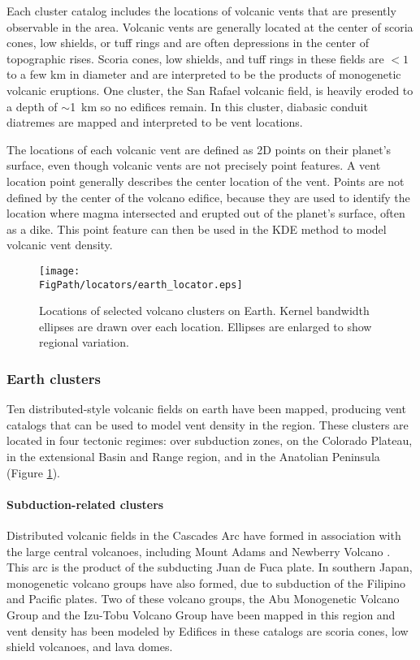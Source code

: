 Each cluster catalog includes the locations of volcanic vents that are presently observable in the area. Volcanic vents are generally located at the center of scoria cones, low shields, or tuff rings and are often depressions in the center of topographic rises. Scoria cones, low shields, and tuff rings in these fields are $<1$ to a few km in diameter and are interpreted to be the products of monogenetic volcanic eruptions. One cluster, the San Rafael volcanic field, is heavily eroded to a depth of $\sim$1~km so no edifices remain. In this cluster, diabasic conduit diatremes are mapped and interpreted to be vent locations.

The locations of each volcanic vent are defined as 2D points on their planet's surface, even though volcanic vents are not precisely point features. A vent location point generally describes the center location of the vent. Points are not defined by the center of the volcano edifice, because they are used to identify the location where magma intersected and erupted out of the planet's surface, often as a dike. This point feature can then be used in the KDE method to model volcanic vent density.

\begin{figure}
\centering
\texttt{[image: \\FigPath/locators/earth\_locator.eps]}
\caption[Locations of selected volcano clusters on Earth]{Locations of selected volcano clusters on Earth. Kernel bandwidth ellipses are drawn over each location. Ellipses are enlarged to show regional variation.}
\label{fig_earthlocator}
\end{figure}

\subsubsection{Earth clusters}
Ten distributed-style volcanic fields on earth have been mapped, producing vent catalogs that can be used to model vent density in the region. These clusters are located in four tectonic regimes: over subduction zones, on the Colorado Plateau, in the extensional Basin and Range region, and in the Anatolian Peninsula (Figure \ref{fig_earthlocator}).

\paragraph{Subduction-related clusters} 
Distributed volcanic fields in the Cascades Arc have formed in association with the large central volcanoes, including Mount Adams \citep{barron2014database} and Newberry Volcano \citep{bard2013database}. This arc is the product of the subducting Juan de Fuca plate. In southern Japan, monogenetic volcano groups have also formed, due to subduction of the Filipino and Pacific plates. Two of these volcano groups, the Abu Monogenetic Volcano Group and the Izu-Tobu Volcano Group have been mapped in this region \citep{kiyosugi2010relationships} and vent density has been modeled by \citet{kiyosugi2012relationship} Edifices in these catalogs are scoria cones, low shield volcanoes, and lava domes.

